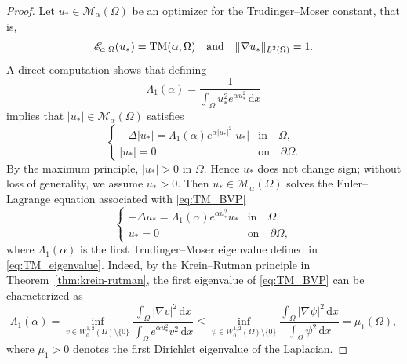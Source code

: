 \documentclass[reqno,11pt]{amsart}
\theoremstyle{definition}
\newcommand{\ud}{\,\mathrm{d}}
\begin{document}
\begin{proof}
Let $u_{*}\in \mathcal{M}_\alpha(\Omega)$ be an optimizer for the Trudinger--Moser constant, that is,
\[
\mathscr{E}_{\alpha,\Omega}(u_*)={\rm TM}({\alpha},\Omega)
\quad\text{and}\quad
\|\nabla u_*\|_{L^2(\Omega)}=1.
\]
A direct computation shows that defining
\begin{equation}\label{eq:first_TM_eigenvalue}
 \Lambda_1({\alpha})=\frac{1}{\int_{\Omega} u_*^2 e^{\alpha u_*^2} \ud x}
\end{equation}
implies that $|u_*|\in \mathcal{M}_\alpha(\Omega)$ satisfies
\begin{equation}\label{eq:u*_abs}
\begin{cases}
-\Delta |u_*|=\Lambda_1({\alpha}) e^{\alpha |u_*|^2} |u_*| & \text{in} \quad\Omega,\\
|u_*|=0 & \text{on} \quad \partial \Omega.
\end{cases}
\end{equation}
By the maximum principle, $|u_*|>0$ in $\Omega$. 
Hence $u_*$ does not change sign; without loss of generality, we assume $u_*>0$. 
Then $u_{*}\in \mathcal{M}_\alpha(\Omega)$ solves the Euler--Lagrange equation associated with \eqref{eq:TM_BVP}
\begin{equation}\label{eqext}
\begin{cases}
-\Delta u_*=\Lambda_1({\alpha})  e^{\alpha u_*^2} u_* & \text{in} \quad \Omega,\\
u_*=0 & \text{on} \quad \partial \Omega,
\end{cases}
\end{equation}
where $\Lambda_1(\alpha)$ is the first Trudinger--Moser eigenvalue defined in \eqref{eq:TM_eigenvalue}. Indeed, by the Krein--Rutman principle in Theorem~\ref{thm:krein-rutman}, the first eigenvalue of \eqref{eq:TM_BVP} can be characterized as
\[
\Lambda_1({\alpha})
=\inf_{v \in W^{1,2}_0(\Omega)\setminus\{0\}}
\frac{\int_{\Omega} |\nabla v|^2 \ud x}
{\int_{\Omega} e^{\alpha u_*^2} v^2 \ud x}
\leq
\inf_{\psi \in W^{1,2}_0(\Omega)\setminus\{0\}}
\frac{\int_{\Omega} |\nabla \psi|^2 \ud x}
{\int_{\Omega}  \psi^2 \ud x}
=\mu_1(\Omega),
\]
where $\mu_1>0$ denotes the first Dirichlet eigenvalue of the Laplacian.


\end{proof}
\end{document}

